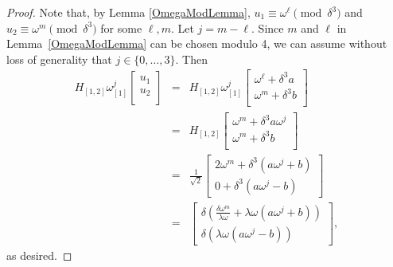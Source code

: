 \documentclass{dalthesis}
\theoremstyle{theorem}
\theoremstyle{definition}
\theoremstyle{definition}  %
\theoremstyle{definition}
\renewcommand{\:}{\mathbin{:}}
\begin{document}
\begin{proof}
Note that, by Lemma \ref{OmegaModLemma}, $u_1\equiv \omega^\ell\pmod{\delta^3}$ and $u_2\equiv\omega^m\pmod{\delta^3}$ for some $\ell,m.$ 
Let $j = m - \ell$. Since $m$ and $\ell$ in Lemma~\ref{OmegaModLemma} can be chosen modulo 4, we can assume without loss of generality that $j\in\{0,\ldots,3\}.$ Then \[\begin{array}{ccc}
H_{[1,2]}\omega_{[1]}^j\left[\begin{array}{c}
u_1\\
u_2\\
\end{array}\right]&=& 
H_{[1,2]}\omega_{[1]}^j\left[\begin{array}{c}
\omega^\ell + \delta^3a\\
\omega^m + \delta^3b\\
\end{array}\right] \\
&=& H_{[1,2]}\left[\begin{array}{c}
\omega^m + \delta^3a\omega^j\\
\omega^m + \delta^3b\\
\end{array}\right]\\
&=&\frac{1}{\sqrt{2}}\left[\begin{array}{c}
2\omega^m + \delta^3(a\omega^j+b)\\
0+\delta^3(a\omega^j-b)
\end{array}
\right]\\
&=&\left[\begin{array}{c}
\delta(\frac{\delta\omega^m}{\lambda\omega}+\lambda\omega(a\omega^j+b))\\
\delta(\lambda\omega(a\omega^j-b))
\end{array}
\right],
\end{array}
\]
as desired.
\end{proof}
\end{document}
